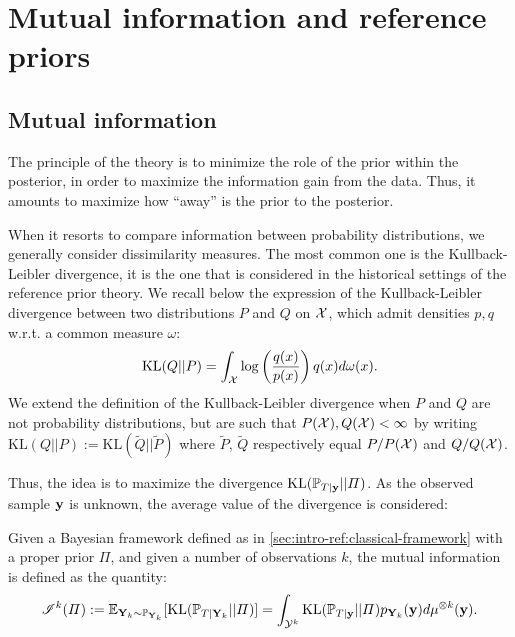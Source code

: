 
\section{Mutual information and reference priors}\label{sec:intro-ref:mutalinfo-ref-priors}

\subsection{Mutual information}\label{sec:intro-ref:mutualinfo}


The principle of the theory 
is to minimize the role of the prior within the posterior, in order to maximize the information gain from the data.
Thus, it amounts to maximize how ``away'' is the prior to the posterior.

When it resorts to compare information between probability distributions, we generally consider dissimilarity measures. The most common one is the Kullback-Leibler divergence, it is the one that is considered in the historical settings of the reference prior theory.
We recall below the expression of the Kullback-Leibler divergence between two distributions $P$ and $Q$ on $\mathcal{X}$, which admit densities $p,q$ w.r.t. a common measure $\omega$: %
    \begin{equation}
        \text{KL}(Q||P)=\int_{\mathcal{X}}\log\left(\frac{q(x)}{p(x)}\right)q(x)d\omega(x).
    \end{equation}
We extend the definition of the Kullback-Leibler divergence when $P$ and $Q$ are not probability distributions, but are such that $P(\mathcal{X}),Q(\mathcal{X})<\infty$ by writing $\text{KL}(Q||P):=\text{KL}(\tilde Q||\tilde P)$ where $\tilde P$, $\tilde Q$ respectively equal $P/P(\mathcal{X})$ and $Q/Q(\mathcal{X})$.

Thus, the idea is to maximize the divergence $\text{KL}(\mathbb{P}_{T|\mathbf{y}}||\varPi)$. As the observed sample $\mathbf{y}$ is unknown, the average value of the divergence is considered:
\begin{defi}\label{def:intro-ref-MI}
    Given a Bayesian framework defined as in \cref{sec:intro-ref:classical-framework} with a proper prior $\varPi$, and given a number of observations $k$, the mutual information is defined as the quantity: %
    \begin{equation}
        \mathscr{I}^k(\varPi) :=  \mathbb{E}_{\mathbf{Y}_k\sim \mathbb{P}_{\mathbf{Y}_k}}[\text{KL}(\mathbb{P}_{T|\mathbf{Y}_k}||\varPi)] =  \int_{\mathcal{Y}^k}\text{KL}(\mathbb{P}_{T|\mathbf{y}}||\varPi) p_{\mathbf{Y}_k}(\mathbf{y})d\mu^{\otimes k}(\mathbf{y}).
    \end{equation}
\end{defi}


